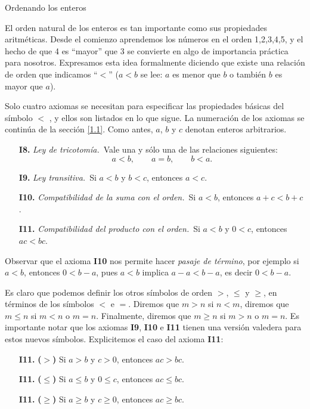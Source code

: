 \documentclass[11pt,spanish,makeidx]{amsbook}
\theoremstyle{definition}
\theoremstyle{remark}
\begin{document}
\begin{section}{Ordenando los enteros}\label{1.2}

El orden natural de los enteros es tan importante como sus propiedades aritméticas. Desde el comienzo aprendemos los números en el orden 1,2,3,4,5, y el hecho de que 4 es ``mayor'' que 3 se convierte en algo de importancia práctica para nosotros. Expresamos esta idea formalmente diciendo que existe una relación de orden que indicamos ``$<$'' ($a < b$ se lee: $a$ es menor que $b$ o también $b$ es mayor que $a$). 

Solo cuatro axiomas se necesitan para especificar las propiedades básicas del símbolo $<$ , y ellos son listados en lo que sigue. La numeración de los axiomas se continúa de la sección \ref{1.1}. Como antes, $a$, $b$ y $c$ denotan enteros arbitrarios. 
\begin{enumerate}
\item[{\bf I8.}] {\em Ley de tricotomía.}\, Vale una y sólo una de las relaciones
siguientes:
$$
a<b, \qquad a = b, \qquad b < a.
$$
\item[{\bf I9.}] {\em Ley transitiva.}\, Si $a< b$ y $b < c$, entonces $a<c$.
\item[{\bf I10.}] {\em Compatibilidad de la suma con el orden.}\, Si $a < b$, entonces $a+c < b+c$. 
\item[{\bf I11.}] {\em Compatibilidad del producto con el orden.}\, Si $a< b$ y $0< c$, entonces $ac < bc$. 
\end{enumerate}

Observar que el axioma {\bf I10} nos permite hacer \textit{pasaje de término}, por ejemplo si $a < b$, entonces $0 < b -a$, pues $a < b$ implica $a - a < b - a$, es decir $0 < b -a$. 

Es claro que podemos definir los otros símbolos de orden $>$, $\le$ y $\ge$, en términos de los símbolos $<$ e $=$. Diremos que $m>n$ si  $n<m$, diremos que $m \le n$ si $m<n$ o $m=n$. Finalmente, diremos que $m \ge n$ si $m > n$ o $m=n$.  Es importante notar que los  axiomas {\bf I9}, {\bf I10} e {\bf I11} tienen una versión valedera para estos nuevos símbolos. Explicitemos el caso  del axioma {\bf I11}:
\begin{enumerate}
\item[{\bf I11.}] {\bf ($>$)} Si $a > b$ y $c>0$, entonces $ac > bc$.
\item[{\bf I11.}] {\bf ($\le$)} Si $a \le b$ y $0 \le c$, entonces $ac \le bc$.
\item[{\bf I11.}] {\bf ($\ge$)} Si $a\ge b$ y $c\ge 0$, entonces $ac \ge bc$.
\end{enumerate}


\end{section}
\end{document}
